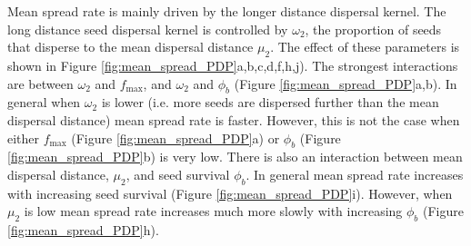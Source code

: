 \documentclass[12pt,a4paper]{article}
\begin{document}
Mean spread rate is mainly driven by the longer distance dispersal kernel. The long distance seed dispersal kernel is controlled by $\omega_2$, the proportion of seeds that disperse to the mean dispersal distance $\mu_2$. The effect of these parameters is shown in Figure \ref{fig:mean_spread_PDP}a,b,c,d,f,h,j). The strongest interactions are between $\omega_2$ and $f_\text{max}$, and $\omega_2$ and $\phi_b$ (Figure \ref{fig:mean_spread_PDP}a,b). In general when $\omega_2$ is lower (i.e. more seeds are dispersed further than the mean dispersal distance) mean spread rate is faster. However, this is not the case when either $f_\text{max}$ (Figure \ref{fig:mean_spread_PDP}a) or $\phi_b$ (Figure \ref{fig:mean_spread_PDP}b) is very low. There is also an interaction between mean dispersal distance, $\mu_2$, and seed survival $\phi_b$. In general mean spread rate increases with increasing seed survival (Figure \ref{fig:mean_spread_PDP}i). However, when $\mu_2$ is low mean spread rate increases much more slowly with increasing $\phi_b$ (Figure \ref{fig:mean_spread_PDP}h).         


 

\end{document}
